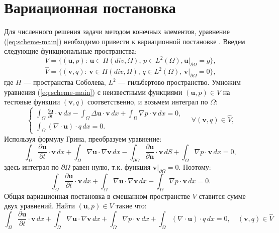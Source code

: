 \documentclass[12pt]{article}
\begin{document}
\section{Вариационная постановка}
Для численного решения задачи методом конечных элементов, уравнение (\ref{eq:scheme-main}) необходимо привести к вариационной постановке \cite{fenicsbook-2012}. Введем следующие функциональные пространства:
$$
V=\{ ({\bm u}, p) : \, {\bm u} \in H(div, \Omega), \, p \in L^2(\Omega),  {\bm u}|_{\partial \Omega}=g \},
$$
$$
\hat V=\{ ({\bm v}, q) : \, {\bm v} \in H(div, \Omega), \, q \in L^2(\Omega), \, {\bm v}|_{\partial \Omega}=0 \},
$$
где $H$ --- пространства Соболева, $L^2$ --- гильбертово пространство.
Умножим уравнения (\ref{eq:scheme-main}) с неизвестными функциями $({\bm u}, p) \in V$  на тестовые функции $({\bm v}, q)$ соответственно, и возьмем интеграл по $\Omega$:
$$
\left\{
\begin{aligned}
\int_{\Omega} \frac{\partial {\bm u}}{\partial t} \cdot {\bm v} \,dx - \int_{\Omega} \Delta {\bm u} \cdot {\bm v} \,dx + \int_{\Omega} \nabla p \cdot {\bm v} \,dx = 0, \\
\int_{\Omega} (\nabla \cdot {\bm u}) \cdot q \,dx = 0.
\end{aligned}
\right.
\quad \forall ({\bm v},q) \in \hat V,
$$
Используя формулу Грина, преобразуем уравнение:
$$
\int_{\Omega} \frac{\partial {\bm u}}{\partial t} \cdot {\bm v} \,dx + \int_{\Omega} \nabla {\bm u} \cdot \nabla {\bm v} \,dx - \int_{\partial \Omega} \frac{\partial {\bm u}}{\partial {\bm n}} \cdot {\bm v} \,dS + \int_{\Omega} \nabla p \cdot {\bm v} \,dx = 0,
$$
здесь интеграл по $\partial \Omega$ равен нулю, т.к. функция ${\bm v} | _ {\partial \Omega} = 0$. Поэтому:
$$
\int_{\Omega} \frac{\partial {\bm u}}{\partial t} \cdot {\bm v} \,dx + \int_{\Omega} \nabla {\bm u} \cdot \nabla {\bm v} \,dx - \int_{\Omega} \nabla p \cdot {\bm v} \,dx = 0.
$$
Общая вариационная постановка в смешанном пространстве $V$ ставится сумме двух уравнений. Найти $({\bm u}, p) \in V$ такие что:
$$
\int_{\Omega} \frac{\partial {\bm u}}{\partial t} \cdot {\bm v} \,dx + \int_{\Omega} \nabla {\bm u} \cdot \nabla {\bm v} \,dx + \int_{\Omega} \nabla p \cdot {\bm v} \,dx + \int_{\Omega} (\nabla \cdot {\bm u}) \cdot q \,dx = 0, \quad ({\bm v}, q) \in \hat V
$$
\end{document}
